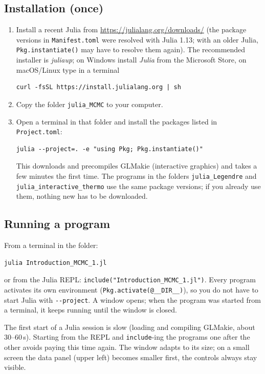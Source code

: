\documentclass[11pt,a4paper]{article}
\newcommand{\file}[1]{\texttt{#1}}
\begin{document}
\subsection{Installation (once)}
\begin{enumerate}
\item Install a recent Julia from \url{https://julialang.org/downloads/} (the package versions in
  \file{Manifest.toml} were resolved with Julia 1.13; with an older Julia, \lstinline{Pkg.instantiate()} may
  have to resolve them again). The recommended installer is \emph{juliaup}; on Windows install
  \emph{Julia} from the Microsoft Store, on macOS/Linux type in a terminal
\begin{lstlisting}
curl -fsSL https://install.julialang.org | sh
\end{lstlisting}
\item Copy the folder \file{julia\_MCMC} to your computer.
\item Open a terminal in that folder and install the packages listed in \file{Project.toml}:
\begin{lstlisting}
julia --project=. -e "using Pkg; Pkg.instantiate()"
\end{lstlisting}
  This downloads and precompiles GLMakie (interactive graphics) and takes a few minutes the first time.
  The programs in the folders \file{julia\_Legendre} and \file{julia\_interactive\_thermo} use the same
  package versions; if you already use them, nothing new has to be downloaded.
\end{enumerate}

\subsection{Running a program}
From a terminal in the folder:
\begin{lstlisting}
julia Introduction_MCMC_1.jl
\end{lstlisting}
or from the Julia REPL: \lstinline{include("Introduction_MCMC_1.jl")}. Every program activates its own
environment (\lstinline{Pkg.activate(@__DIR__)}), so you do not have to start Julia with
\lstinline{--project}. A window opens; when the program was started from a terminal, it keeps running until
the window is closed.

\begin{note}
The first start of a Julia session is slow (loading and compiling GLMakie, about 30--60\,s). Starting from
the REPL and \lstinline{include}-ing the programs one after the other avoids paying this time again.
The window adapts to its size; on a small screen the data panel (upper left) becomes smaller first, the
controls always stay visible.
\end{note}
\end{document}
